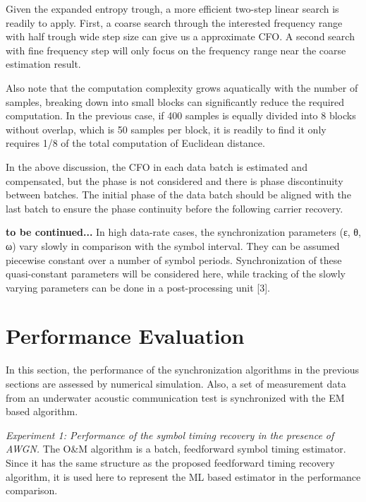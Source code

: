\documentclass[journal,comsoc]{IEEEtran}
\begin{document}
Given the expanded entropy trough, a more efficient two-step linear search is readily to apply.
First, a coarse search through the interested frequency range with half trough wide step size can give us a approximate CFO.
A second search with fine frequency step will only focus on the frequency range near the coarse estimation result.

Also note that the computation complexity grows aquatically with the number of samples, breaking down into small blocks can significantly reduce the required computation.
In the previous case, if 400 samples is equally divided into 8 blocks without overlap, which is 50 samples per block, it is readily to find it only requires 1/8 of the total computation of Euclidean distance. 


In the above discussion, the CFO in each data batch is estimated and compensated,
but the phase is not considered and there is  phase discontinuity between batches.
The initial phase of the data batch should be aligned with the last batch to ensure the phase continuity before the following carrier recovery.

\textbf{to be continued...}
In high data-rate cases, the synchronization parameters
(ε, θ, ω) vary slowly in comparison with the symbol interval.
They can be assumed piecewise constant over a number of
symbol periods. Synchronization of these quasi-constant parameters
will be considered here, while tracking of the slowly
varying parameters can be done in a post-processing unit [3].
\section{Performance Evaluation}
\label{sec:performance}
In this section, the performance of the synchronization algorithms in the previous sections are assessed by numerical simulation.
Also, a set of measurement data from an underwater acoustic communication test is synchronized with the EM based algorithm.

\textit{Experiment 1:
Performance of the symbol timing recovery in the presence of AWGN.}
The O\&M algorithm is a batch, feedforward symbol timing estimator.
Since it has the same structure as the proposed feedforward timing recovery algorithm, it is used here to represent the ML based estimator in the performance comparison.
\end{document}
